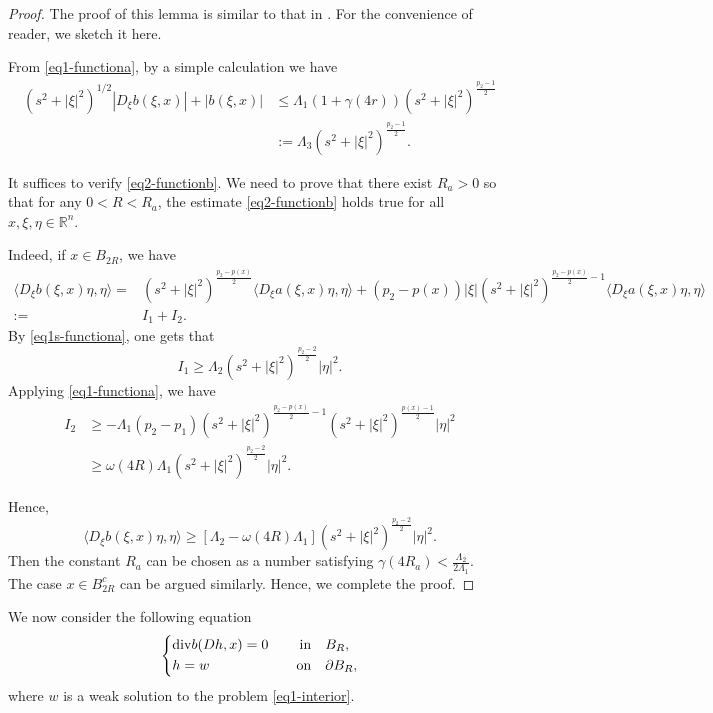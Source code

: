 \documentclass[a4paper,10pt]{amsart}
\newcommand{\px}{p(x)}
\newcommand{\f}{\frac}
\newcommand{\di}{{\rm div}}
\begin{document}
\begin{proof}
	The proof of this lemma is similar to that  in \cite[p. 13]{BOR}. For the convenience of reader, we sketch it here.
	
	From \eqref{eq1-functiona}, by a simple calculation we have
	$$
	\begin{aligned}
	(s^2+|\xi|^2)^{1/2}|D_\xi b(\xi,x)|+|b(\xi,x)|&\leq \Lambda_1(1+\gamma(4r))(s^2+|\xi|^2)^{\f{p_2-1}{2}}\\
	&:=\Lambda_3(s^2+|\xi|^2)^{\f{p_2-1}{2}}.
	\end{aligned}
	$$
	
	It suffices to verify \eqref{eq2-functionb}. We need to prove that there exist $R_a>0$ so that for any $0<R<R_a$, the estimate \eqref{eq2-functionb} holds true for all $x,\xi,\eta \in \mathbb{R}^n$.
	
	Indeed, if $x\in B_{2R}$, we have 
	$$
	\begin{aligned}
	 \langle D_\xi b(\xi,x)\eta,\eta\rangle =&(s^2+|\xi|^2)^{\f{p_2-p(x)}{2}} \langle D_\xi a(\xi,x)\eta,\eta\rangle +
	(p_2-p(x))|\xi|(s^2+|\xi|^2)^{\f{p_2-p(x)}{2}-1}  \langle D_\xi a(\xi,x)\eta,\eta\rangle \\
	:=& I_1+I_2.
	\end{aligned}
	$$
	By \eqref{eq1s-functiona}, one gets that
	$$
	I_1\geq \Lambda_2 (s^2+|\xi|^2)^{\f{p_2-2}{2}}|\eta|^2. 
	$$
	Applying \eqref{eq1-functiona}, we have
	$$
	\begin{aligned}
	I_2&\geq -\Lambda_1(p_2-p_1)(s^2+|\xi|^2)^{\f{p_2-p(x)}{2}-1}(s^2+|\xi|^2)^{\f{\px-1}{2}}|\eta|^2\\
	&\geq \omega(4R)\Lambda_1 (s^2+|\xi|^2)^{\f{p_2-2}{2}}|\eta|^2.
	\end{aligned}
		$$ 
		
	Hence,
	$$
	\langle D_\xi b(\xi,x)\eta,\eta\rangle  \geq [\Lambda_2-\omega(4R)\Lambda_1] (s^2+|\xi|^2)^{\f{p_2-2}{2}}|\eta|^2.
	$$
	Then the constant $R_a$ can be chosen as a number satisfying $\gamma(4R_a)<\f{\Lambda_2}{2\Lambda_1}$.\\
	
	
	The case $x\in B_{2R}^c$ can be argued similarly. Hence, we complete the proof.
\end{proof}

We now consider the following equation
\begin{equation}\label{eq2-interior}
\left\{
\begin{aligned}
&\di b(Dh, x)=0 \quad &\text{in}& \quad B_{R},\\
&h=w  \quad &\text{on}& \quad \partial B_{R},
\end{aligned}
\right.
\end{equation}
where $w$ is a weak solution to the problem \eqref{eq1-interior}.
\end{document}
